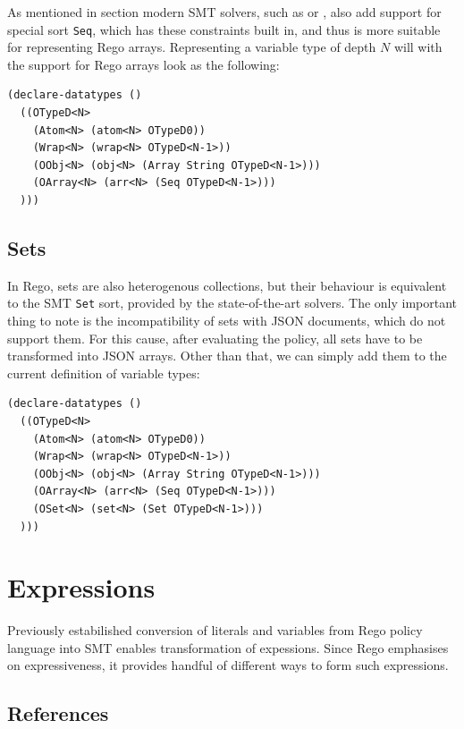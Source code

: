   As mentioned in section \todo{\ref{sec:smt}} modern SMT solvers, such as \ziii or , also add support for special sort \texttt{Seq}, which has these constraints built in, and thus is more suitable for representing Rego arrays.
  Representing a variable type of depth $N$ will with the support for Rego arrays look as the following:
\begin{lstlisting}[language=lisp]
(declare-datatypes ()
  ((OTypeD<N>
    (Atom<N> (atom<N> OTypeD0))
    (Wrap<N> (wrap<N> OTypeD<N-1>))
    (OObj<N> (obj<N> (Array String OTypeD<N-1>)))
    (OArray<N> (arr<N> (Seq OTypeD<N-1>)))
  )))
\end{lstlisting}


  \subsection{Sets}

  In Rego, sets are also heterogenous collections, but their behaviour is equivalent to the SMT \texttt{Set} sort, provided by the state-of-the-art solvers.
  The only important thing to note is the incompatibility of sets with JSON documents, which do not support them.
  For this cause, after evaluating the policy, all sets have to be transformed into JSON arrays.
  Other than that, we can simply add them to the current definition of variable types:
\begin{lstlisting}[language=lisp]
(declare-datatypes ()
  ((OTypeD<N>
    (Atom<N> (atom<N> OTypeD0))
    (Wrap<N> (wrap<N> OTypeD<N-1>))
    (OObj<N> (obj<N> (Array String OTypeD<N-1>)))
    (OArray<N> (arr<N> (Seq OTypeD<N-1>)))
    (OSet<N> (set<N> (Set OTypeD<N-1>)))
  )))
\end{lstlisting}

\section{Expressions}


Previously estabilished conversion of literals and variables from Rego policy language into SMT enables transformation of expessions.
Since Rego emphasises on expressiveness, it provides handful of different ways to form such expressions.

\subsection{References}

